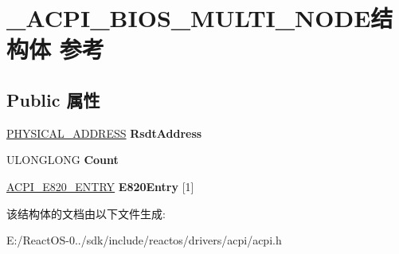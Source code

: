 \hypertarget{struct___a_c_p_i___b_i_o_s___m_u_l_t_i___n_o_d_e}{}\section{\+\_\+\+A\+C\+P\+I\+\_\+\+B\+I\+O\+S\+\_\+\+M\+U\+L\+T\+I\+\_\+\+N\+O\+D\+E结构体 参考}
\label{struct___a_c_p_i___b_i_o_s___m_u_l_t_i___n_o_d_e}
\subsection*{Public 属性}
\begin{DoxyCompactItemize}
\item 
\mbox{\label{struct___a_c_p_i___b_i_o_s___m_u_l_t_i___n_o_d_e_a5d7296b6ee5436fe63e9c38d12c31497}} 
\hyperlink{union___l_a_r_g_e___i_n_t_e_g_e_r}{P\+H\+Y\+S\+I\+C\+A\+L\+\_\+\+A\+D\+D\+R\+E\+SS} {\bfseries Rsdt\+Address}
\item 
\mbox{\label{struct___a_c_p_i___b_i_o_s___m_u_l_t_i___n_o_d_e_a537d78e1cd9319e92658fd08950d0fa6}} 
U\+L\+O\+N\+G\+L\+O\+NG {\bfseries Count}
\item 
\mbox{\label{struct___a_c_p_i___b_i_o_s___m_u_l_t_i___n_o_d_e_a3457d101234ffdbd9c25c86b6244e528}} 
\hyperlink{struct___a_c_p_i___e820___e_n_t_r_y}{A\+C\+P\+I\+\_\+\+E820\+\_\+\+E\+N\+T\+RY} {\bfseries E820\+Entry} \mbox{[}1\mbox{]}
\end{DoxyCompactItemize}


该结构体的文档由以下文件生成\+:\begin{DoxyCompactItemize}
\item 
E\+:/\+React\+O\+S-\/0../sdk/include/reactos/drivers/acpi/acpi.\+h\end{DoxyCompactItemize}
